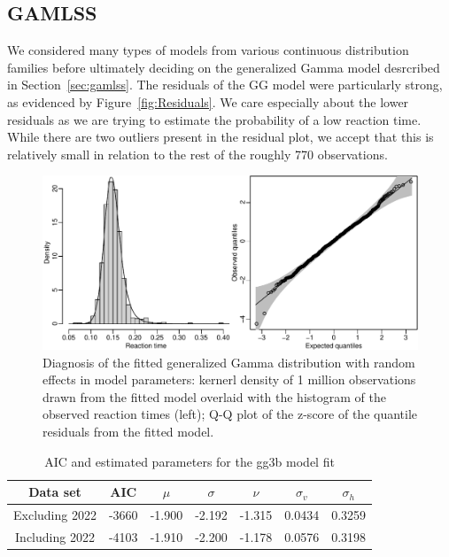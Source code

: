 \documentclass[12pt, letterpaper]{article}
\begin{document}
\subsection{GAMLSS} \label{subsec:Results_GLMM}


We considered many types of models from various continuous distribution families
before ultimately deciding on the generalized Gamma model desrcribed in
Section~\ref{sec:gamlss}.  The residuals of the GG model were particularly
strong, as evidenced by Figure~\ref{fig:Residuals}.  We care especially about
the lower residuals as we are trying to estimate the probability of a low reaction
time.  While there are two outliers present in the residual plot, we accept that
this is relatively small in relation to the rest of the roughly 770 observations.


\begin{figure}[tbp]
  \centering
  \includegraphics{diagnosis.pdf}
  \caption{Diagnosis of the fitted generalized Gamma distribution with
    random effects in model parameters: kernerl density of 1 million
    observations drawn from the fitted model overlaid with the
    histogram of the observed reaction times (left); Q-Q plot of the
    z-score of the quantile residuals from the fitted model.}
  \label{fig:diagnosis}
\end{figure}

\begin{table}
  \centering
  \caption{AIC and estimated parameters for the gg3b model fit}
  \label{tab:Gamma_parameters}
  \begin{tabular}{c c c c c c c}
    \toprule
    Data set & AIC & $\mu$ & $\sigma$ & $\nu$ & $\sigma_v$ & $\sigma_h$ \\
    \midrule
    Excluding 2022 & -3660 & -1.900 & -2.192 & -1.315 & 0.0434 & 0.3259 \\
    Including 2022 & -4103 & -1.910 & -2.200 & -1.178 & 0.0576 & 0.3198 \\
    \bottomrule
  \end{tabular}
\end{table}
\end{document}
